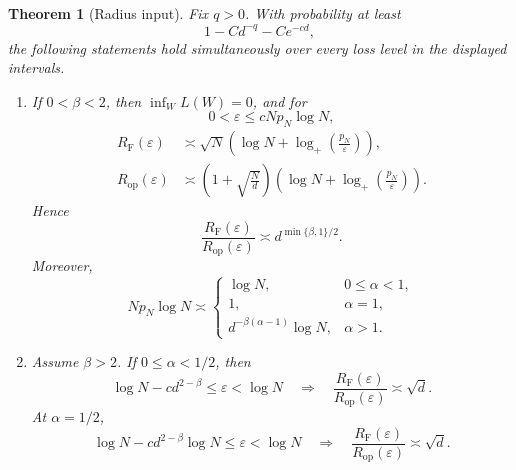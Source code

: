 \documentclass[11pt]{article}
\newtheorem{theorem}{Theorem}[section]
\newcommand{\eps}{\varepsilon}
\newcommand{\RF}{R_{\mathrm F}}
\newcommand{\Rop}{R_{\mathrm{op}}}
\newcommand{\logp}[1]{\log_+\!\left(#1\right)}
\begin{document}
\begin{theorem}[Radius input]
\label{thm:radius-input}
Fix $q>0$.  With probability at least
\[
 1-Cd^{-q}-Ce^{-cd},
\]
the following statements hold simultaneously over every loss level in
the displayed intervals.

\begin{enumerate}[label=\textup{(\roman*)},leftmargin=2.2em]
\item If $0<\beta<2$, then $\inf_WL(W)=0$, and for
\begin{equation}
 0<\eps\leq cNp_N\log N,
 \label{eq:sub-radius-phase}
\end{equation}
\begin{align}
 \RF(\eps)
 &\asymp
 \sqrt N\left(\log N+\logp{\frac{p_N}{\eps}}\right),
 \label{eq:sub-RF}\\
 \Rop(\eps)
 &\asymp
 \left(1+\sqrt{\frac Nd}\right)
 \left(\log N+\logp{\frac{p_N}{\eps}}\right).
 \label{eq:sub-Rop}
\end{align}
Hence
\begin{equation}
 \frac{\RF(\eps)}{\Rop(\eps)}
 \asymp d^{\min\{\beta,1\}/2}.
 \label{eq:sub-radius-ratio}
\end{equation}
Moreover,
\begin{equation}
 Np_N\log N\asymp
 \begin{cases}
 \log N,&0\leq\alpha<1,\\
 1,&\alpha=1,\\
 d^{-\beta(\alpha-1)}\log N,&\alpha>1.
 \end{cases}
 \label{eq:sub-endpoint}
\end{equation}

\item Assume $\beta>2$.  If $0\leq\alpha<1/2$, then
\begin{equation}
 \log N-cd^{2-\beta}\leq\eps<\log N
 \quad\Longrightarrow\quad
 \frac{\RF(\eps)}{\Rop(\eps)}\asymp\sqrt d.
 \label{eq:radius-diffuse-below}
\end{equation}
At $\alpha=1/2$,
\begin{equation}
 \log N-cd^{2-\beta}\log N\leq\eps<\log N
 \quad\Longrightarrow\quad
 \frac{\RF(\eps)}{\Rop(\eps)}\asymp\sqrt d.
 \label{eq:radius-diffuse-half}
\end{equation}


\end{enumerate}
\end{theorem}
\end{document}
